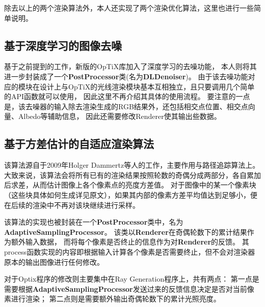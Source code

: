 除去以上的两个渲染算法外，本人还实现了两个渲染优化算法，这里也进行一些简单说明。

\subsection{基于深度学习的图像去噪}

基于之前提到的工作\cite{NvidiaDenoiser}，新版的OpTiX库加入了深度学习的去噪功能，
本人则将其进一步封装成了一个\textbf{PostProcessor}类(名为\textbf{DLDenoiser})。
由于该去噪功能对应的模块在设计上与OpTiX的光线渲染模块基本互相独立，且只要调用几个简单的API函数就可以使用，
因此这里不再介绍其具体的使用流程。
要注意的一点是，该去噪器的输入除去渲染生成的RGB结果外，还包括相交点位置、相交点向量、Albedo等辅助信息，
因此还需要修改Renderer使其输出些数据。

\subsection{基于方差估计的自适应渲染算法}

\label{adaptive}

该算法源自于2009年Holger Dammertz等人的工作\cite{AdaptiveSampling}，主要作用与路径追踪算法上。
大致来说，该算法会将所有已有的渲染结果按照轮数的奇偶分成两部分，各自累加后求差，从而估计图像上各个像素点的亮度方差值。
对于图像中的某一个像素块（这些块具体如何生成详见原文），如果其内部的像素方差平均值达到足够小，便在后续的渲染中不再对该块继续进行采样。

该算法的实现也被封装在一个\textbf{PostProcessor}类中，名为\textbf{AdaptiveSamplingProcessor}。
该类以\textbf{Renderer}在奇偶轮数下的累计结果作为额外输入数据，
而将每个像素是否终止的信息作为对\textbf{Renderer}的反馈。
其process函数实现的内容即根据输入计算各个像素是否需要终止，但不会对渲染器原本的输出图像进行任何修改。

对于Optix程序的修改则主要集中在Ray Generation程序上，共有两点：
第一点是需要根据\textbf{AdaptiveSamplingProcessor}发送过来的反馈信息决定是否对当前像素进行渲染；
第二点则是需要额外输出奇偶轮数下的累计光照亮度。

